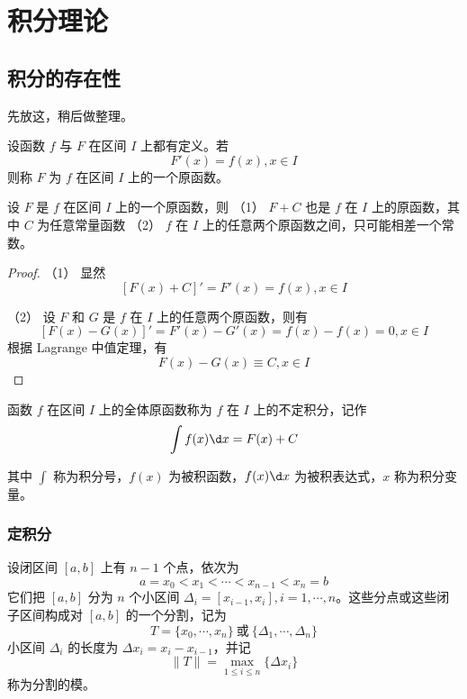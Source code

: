 
\chapter{积分理论}

\section{积分的存在性}

先放这，稍后做整理。

\begin{definition}
	设函数 $f$ 与 $F$ 在区间 $I$ 上都有定义。若
	$$F'(x) = f(x), x\in I$$
	则称 $F$ 为 $f$ 在区间 $I$ 上的一个原函数。
\end{definition}

\begin{theorem}
	设 $F$ 是 $f$ 在区间 $I$ 上的一个原函数，则
	（1） $F+C$ 也是 $f$ 在 $I$ 上的原函数，其中 $C$ 为任意常量函数
	（2） $f$ 在 $I$ 上的任意两个原函数之间，只可能相差一个常数。
\end{theorem}
\begin{proof}
	（1） 显然
	$$\left[ F(x)+C \right]' = F'(x) = f(x), x\in I$$

	（2） 设 $F$ 和 $G$ 是 $f$ 在 $I$ 上的任意两个原函数，则有
	$$\left[ F(x)-G(x) \right]' = F'(x) - G'(x) = f(x) - f(x) = 0, x\in I$$
	根据 Lagrange 中值定理，有
	$$F(x) - G(x) \equiv C, x\in I$$
\end{proof}

\begin{definition}
	函数 $f$ 在区间 $I$ 上的全体原函数称为 $f$ 在 $I$ 上的不定积分，记作
	$$\int f(x) \d x = F(x) + C$$
\end{definition}

其中 $\displaystyle\int$ 称为积分号，$f(x)$ 为被积函数，$f(x)\d x$ 为被积表达式，$x$ 称为积分变量。

\subsection{定积分}

设闭区间 $[a,b]$ 上有 $n-1$ 个点，依次为
$$a = x_0 < x_1 < \cdots < x_{n-1} < x_n = b$$
它们把 $[a,b]$ 分为 $n$ 个小区间 $\Delta_i = [x_{i-1},x_i], i=1,\cdots,n$。这些分点或这些闭子区间构成对 $[a,b]$ 的一个分割，记为
$$T=\{x_0,\cdots,x_n\}\ \text{或}\ \{\Delta_1,\cdots,\Delta_n\}$$
小区间 $\Delta_i$ 的长度为 $\Delta x_i = x_i-x_{i-1}$，并记
$$\| T \| = \max_{1 \leqslant i \leqslant n}\{\Delta x_i\}$$
称为分割的模。

